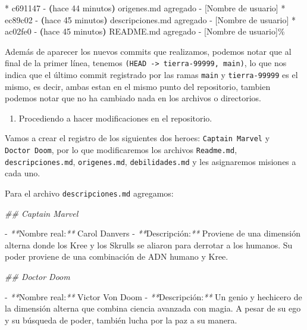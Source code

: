 \documentclass[
]{book}
\newenvironment{Shaded}{\begin{snugshade}}{\end{snugshade}}
\newcommand{\AttributeTok}[1]{\textcolor[rgb]{0.13,0.29,0.53}{#1}}
\newcommand{\CommentTok}[1]{\textcolor[rgb]{0.56,0.35,0.01}{\textit{#1}}}
\newcommand{\ErrorTok}[1]{\textcolor[rgb]{0.64,0.00,0.00}{\textbf{#1}}}
\newcommand{\ExtensionTok}[1]{#1}
\newcommand{\KeywordTok}[1]{\textcolor[rgb]{0.13,0.29,0.53}{\textbf{#1}}}
\newcommand{\NormalTok}[1]{#1}
\newcommand{\PreprocessorTok}[1]{\textcolor[rgb]{0.56,0.35,0.01}{\textit{#1}}}
\providecommand{\tightlist}{%
  \setlength{\itemsep}{0pt}\setlength{\parskip}{0pt}}
\begin{document}
\begin{Shaded}
\begin{Highlighting}[]
\ExtensionTok{*}\NormalTok{ c691147 }\AttributeTok{{-}} \ErrorTok{(}\ExtensionTok{hace}\NormalTok{ 44 minutos}\KeywordTok{)} \ExtensionTok{origenes.md}\NormalTok{ agregado }\AttributeTok{{-}}\NormalTok{ [Nombre de usuario]}
\ExtensionTok{*}\NormalTok{ ec89c02 }\AttributeTok{{-}} \ErrorTok{(}\ExtensionTok{hace}\NormalTok{ 45 minutos}\KeywordTok{)} \ExtensionTok{descripciones.md}\NormalTok{ agregado }\AttributeTok{{-}}\NormalTok{ [Nombre de usuario]}
\ExtensionTok{*}\NormalTok{ ac02fe0 }\AttributeTok{{-}} \ErrorTok{(}\ExtensionTok{hace}\NormalTok{ 45 minutos}\KeywordTok{)} \ExtensionTok{README.md}\NormalTok{ agregado }\AttributeTok{{-}}\NormalTok{ [Nombre de usuario]\%}
\end{Highlighting}
\end{Shaded}

Además de aparecer los nuevos commits que realizamos, podemos notar que al final de la primer línea, tenemos \texttt{(HEAD\ -\textgreater{}\ tierra-99999,\ main)}, lo que nos indica que el último commit registrado por las ramas \texttt{main} y \texttt{tierra-99999} es el mismo, es decir, ambas estan en el mismo punto del repositorio, tambien podemos notar que no ha cambiado nada en los archivos o directorios.

\begin{enumerate}
\def\labelenumi{\arabic{enumi}.}
\setcounter{enumi}{2}
\tightlist
\item
  Procediendo a hacer modificaciones en el repositorio.
\end{enumerate}

Vamos a crear el registro de los siguientes dos heroes: \texttt{Captain\ Marvel} y \texttt{Doctor\ Doom}, por lo que modificaremos los archivos \texttt{Readme.md}, \texttt{descripciones.md}, \texttt{origenes.md}, \texttt{debilidades.md} y les asignaremos misiones a cada uno.

Para el archivo \texttt{descripciones.md} agregamos:

\begin{Shaded}
\begin{Highlighting}[]

\CommentTok{\#\# Captain Marvel}

\ExtensionTok{{-}} \PreprocessorTok{**}\NormalTok{Nombre real:}\PreprocessorTok{**}\NormalTok{ Carol Danvers}
\ExtensionTok{{-}} \PreprocessorTok{**}\NormalTok{Descripción:}\PreprocessorTok{**}\NormalTok{ Proviene de una dimensión alterna donde los Kree y los Skrulls se aliaron para derrotar a los humanos. Su poder proviene de una combinación de ADN humano y Kree.}

\CommentTok{\#\# Doctor Doom}

\ExtensionTok{{-}} \PreprocessorTok{**}\NormalTok{Nombre real:}\PreprocessorTok{**}\NormalTok{ Victor Von Doom}
\ExtensionTok{{-}} \PreprocessorTok{**}\NormalTok{Descripción:}\PreprocessorTok{**}\NormalTok{ Un genio y hechicero de la dimensión alterna que combina ciencia avanzada con magia. A pesar de su ego y su búsqueda de poder, también lucha por la paz a su manera.}
\end{Highlighting}
\end{Shaded}
\end{document}

